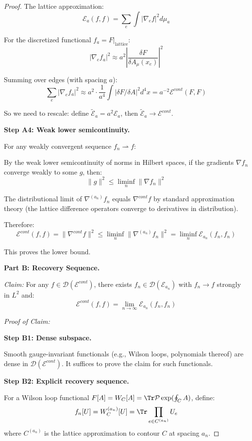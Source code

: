 \begin{proof}
The lattice approximation:
\[
\mathcal{E}_a(f, f) = \sum_{e} \int |\nabla_e f|^2 d\mu_a
\]

For the discretized functional $f_a = F|_{\text{lattice}}$:
\[
|\nabla_e f_a|^2 \approx a^2 \left|\frac{\delta F}{\delta A_\mu(x_e)}\right|^2
\]

Summing over edges (with spacing $a$):
\[
\sum_e |\nabla_e f_a|^2 \approx a^2 \cdot \frac{1}{a^4} \int |\delta F/\delta A|^2 d^4x 
= a^{-2} \mathcal{E}^{cont}(F, F)
\]

So we need to rescale: define $\tilde{\mathcal{E}}_a = a^2 \mathcal{E}_a$, then 
$\tilde{\mathcal{E}}_a \to \mathcal{E}^{cont}$.

\textbf{Step A4: Weak lower semicontinuity.}

For any weakly convergent sequence $f_n \rightharpoonup f$:

By the weak lower semicontinuity of norms in Hilbert spaces, if the gradients 
$\nabla f_n$ converge weakly to some $g$, then:
\[
\|g\|^2 \leq \liminf_n \|\nabla f_n\|^2
\]

The distributional limit of $\nabla^{(a_n)} f_n$ equals $\nabla^{cont} f$ by 
standard approximation theory (the lattice difference operators converge to 
derivatives in distribution).

Therefore:
\[
\mathcal{E}^{cont}(f, f) = \|\nabla^{cont} f\|^2 \leq \liminf_n \|\nabla^{(a_n)} f_n\|^2 
= \liminf_n \mathcal{E}_{a_n}(f_n, f_n)
\]

This proves the lower bound.

\textbf{Part B: Recovery Sequence.}

\textit{Claim:} For any $f \in \mathcal{D}(\mathcal{E}^{cont})$, there exists 
$f_n \in \mathcal{D}(\mathcal{E}_{a_n})$ with $f_n \to f$ strongly in $L^2$ and:
\[
\mathcal{E}^{cont}(f, f) = \lim_{n \to \infty} \mathcal{E}_{a_n}(f_n, f_n)
\]

\textit{Proof of Claim:}

\textbf{Step B1: Dense subspace.}

Smooth gauge-invariant functionals (e.g., Wilson loops, polynomials thereof) 
are dense in $\mathcal{D}(\mathcal{E}^{cont})$. It suffices to prove the claim 
for such functionals.

\textbf{Step B2: Explicit recovery sequence.}

For a Wilson loop functional $F[A] = W_C[A] = \Tr\mathcal{P}\exp(\oint_C A)$, 
define:
\[
f_n[U] = W_C^{(a_n)}[U] = \Tr \prod_{e \in C^{(a_n)}} U_e
\]
where $C^{(a_n)}$ is the lattice approximation to contour $C$ at spacing $a_n$.


\end{proof}
